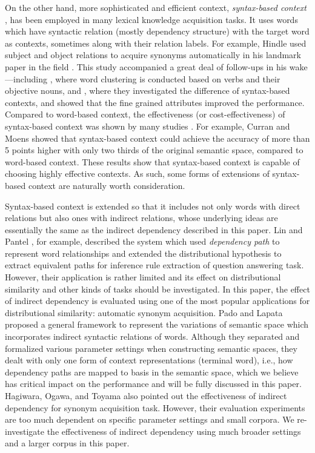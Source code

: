 \documentclass[english]{jnlp_1.4}
\begin{document}
On the other hand, more sophisticated and efficient context, {\em
  syntax-based context} \cite{Pado:07}, has been employed in many
lexical knowledge acquisition tasks. It uses words which have
syntactic relation (mostly dependency structure) with the target word
as contexts, sometimes along with their relation labels. For example,
Hindle used subject and object relations to acquire synonyms
automatically in his landmark paper in the field \cite{Hindle:90}.
This study accompanied a great deal of follow-ups in his wake---including
\cite{Pereira:95}, where word clustering is conducted based on verbs
and their objective nouns, and \cite{Gamallo:01}, where they
investigated the difference of syntax-based contexts, and showed that
the fine grained attributes improved the performance. Compared to
word-based context, the effectiveness (or cost-effectiveness) of
syntax-based context was shown by many studies
\cite{Curran:02:scaling,Hagiwara:06,Pado:07}. For example, Curran and
Moens \cite{Curran:02:scaling} showed that syntax-based context could
achieve the accuracy of more than 5 points higher with only two thirds
of the original semantic space, compared to word-based context. These
results show that syntax-based context is capable of choosing highly
effective contexts. As such, some forms of extensions of syntax-based
context are naturally worth consideration.


Syntax-based context is extended so that it includes not only words
with direct relations but also ones with indirect relations, whose
underlying ideas are essentially the same as the indirect dependency
described in this paper. Lin and Pantel \cite{Lin:01}, for example,
described the system which used {\em dependency path} to represent
word relationships and extended the distributional hypothesis to
extract equivalent paths for inference rule extraction of question
answering task. However, their application is rather limited and its
effect on distributional similarity and other kinds of tasks should be
investigated. In this paper, the effect of indirect dependency is
evaluated using one of the most popular applications for
distributional similarity: automatic synonym acquisition. Pado and
Lapata \cite{Pado:07} proposed a general framework to represent the
variations of semantic space which incorporates indirect syntactic
relations of words. Although they separated and formalized various
parameter settings when constructing semantic spaces, they dealt with
only one form of context representations (terminal word), i.e., how
dependency paths are mapped to basis in the semantic space, which we
believe has critical impact on the performance and will be fully
discussed in this paper. Hagiwara, Ogawa, and Toyama
\cite{Hagiwara:07} also pointed out the effectiveness of indirect
dependency for synonym acquisition task. However, their evaluation
experiments are too much dependent on specific parameter settings and
small corpora. We re-investigate the effectiveness of indirect
dependency using much broader settings and a larger corpus in this
paper.
\end{document}
